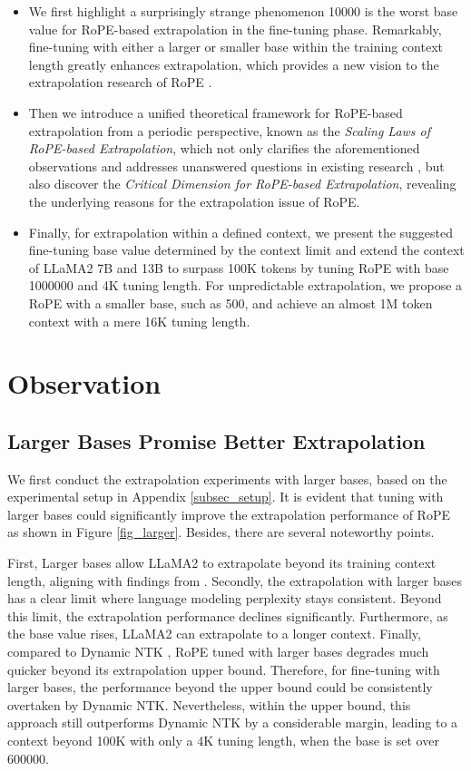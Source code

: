 \begin{itemize}
    \itemsep0em \item We first highlight a surprisingly strange phenomenon 10000 is the worst base value for RoPE-based extrapolation in the fine-tuning phase. Remarkably, fine-tuning with either a larger or smaller base within the training context length greatly enhances extrapolation, which provides a new vision to the extrapolation research of RoPE \citep{su2021roformer}.
    \item Then we introduce a unified theoretical framework for RoPE-based extrapolation from a periodic perspective, known as the \textit{Scaling Laws of RoPE-based Extrapolation}, which not only clarifies the aforementioned observations and addresses unanswered questions in existing research \citep{roziere2023code}, but also discover the \textit{Critical Dimension for RoPE-based Extrapolation}, revealing the underlying reasons for the extrapolation issue of RoPE.
    \item Finally, for extrapolation within a defined context, we present the suggested fine-tuning base value determined by the context limit and extend the context of LLaMA2 7B and 13B \citep{touvron2023llama2} to surpass 100K tokens by tuning RoPE with base 1000000 and 4K tuning length. For unpredictable extrapolation, we propose a RoPE with a smaller base, such as 500, and achieve an almost 1M token context with a mere 16K tuning length.
\end{itemize}

\section{Observation}\label{sec_obs}

\subsection{Larger Bases Promise Better Extrapolation}

We first conduct the extrapolation experiments with larger bases, based on the experimental setup in Appendix \ref{subsec_setup}. It is evident that tuning with larger bases could significantly improve the extrapolation performance of RoPE as shown in Figure \ref{fig_larger}. Besides, there are several noteworthy points. 

First, Larger bases allow LLaMA2 \citep{touvron2023llama2} to extrapolate beyond its training context length, aligning with findings from \citet{roziere2023code}. Secondly, the extrapolation with larger bases has a clear limit where language modeling perplexity stays consistent. Beyond this limit, the extrapolation performance declines significantly. Furthermore, as the base value rises, LLaMA2 can extrapolate to a longer context. Finally, compared to Dynamic NTK \citep{dynamicNTK}, RoPE tuned with larger bases degrades much quicker beyond its extrapolation upper bound. Therefore, for fine-tuning with larger bases, the performance beyond the upper bound could be consistently overtaken by Dynamic NTK. Nevertheless, within the upper bound, this approach still outperforms Dynamic NTK by a considerable margin, leading to a context beyond 100K with only a 4K tuning length, when the base is set over 600000.

